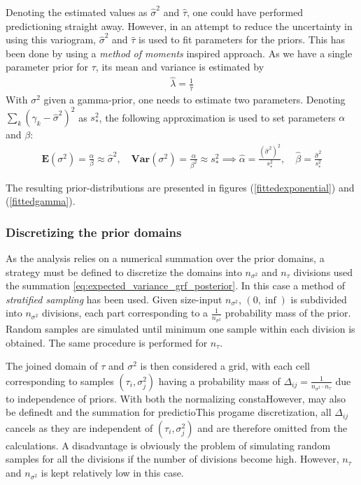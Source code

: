 Denoting the estimated values as $\hat{\sigma}^2$ and $\hat{\tau}$, one could have performed predictioning straight away. However, in an attempt to reduce the uncertainty in using this variogram, $\hat{\sigma}^2$ and $\hat{\tau}$ is used to fit parameters for the priors. This has been done by using a \textit{method of moments} inspired approach. As we have a single parameter prior for $\tau$, its mean and variance is estimated by 
\begin{align}
\hat{\lambda} = \frac{1}{\hat{\tau}}
\end{align}
With $\sigma^2$ given a gamma-prior, one needs to estimate two parameters. Denoting $\sum_k (\gamma_k - \hat{\sigma}^2)^2$ as $s_*^2$, the following approximation is used to set parameters $\alpha$ and $\beta$:
\begin{align}
\mathbf{E}(\sigma^2) = \frac{\alpha}{\beta} \approx \hat{\sigma}^2, \quad
\mathbf{Var}(\sigma^2) = \frac{\alpha}{\beta^2} \approx s_*^2 
\implies 
\hat{\alpha} = \frac{(\hat{\sigma}^2)^2}{s_*^2}, \quad  \hat{\beta} = \frac{\hat{\sigma}^2}{s_*^2}
\end{align}

The resulting prior-distributions are presented in figures (\ref{fittedexponential}) and (\ref{fittedgamma}).

\subsubsection{Discretizing the prior domains}
As the analysis relies on a numerical summation over the prior domains, a strategy must be defined to discretize the domains into $n_{\sigma^2}$ and $n_{\tau}$ divisions used the summation \ref{eq:expected_variance_grf_posterior}. In this case a method of \textit{stratified sampling} has been used. Given size-input $n_{\sigma^2}$, $(0,\inf)$ is subdivided into $n_{\sigma^2}$ divisions, each part corresponding to a $\frac{1}{n_{\sigma^2}}$ probability mass of the prior. Random samples are simulated until minimum one sample within each division is obtained. The same procedure is performed for $n_{\tau}$. 

The joined domain of $\tau$ and $\sigma^2$ is then considered a grid, with each cell corresponding to samples $(\tau_i, \sigma_j^2)$ having a probability mass of $\Delta_{ij} = \frac{1}{n_{\sigma^2} \cdot n_{\tau}}$ due to independence of priors. With both the normalizing constaHowever, may also be definedt and the summation for predictioThis progame discretization, all $\Delta_{ij}$ cancels as they are independent of $(\tau_i, \sigma_j^2)$ and are therefore omitted from the calculations. A disadvantage is obviously the problem of simulating random samples for all the divisions if the number of divisions become high. However, $n_{\tau}$ and $n_{\sigma^2}$ is kept relatively low in this case. 

